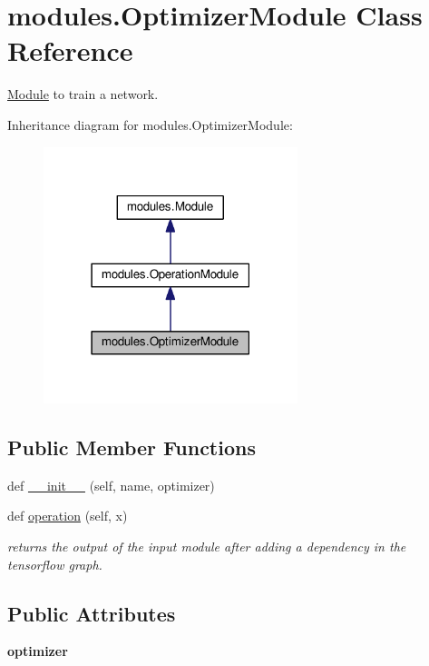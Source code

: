 \hypertarget{classmodules_1_1_optimizer_module}{}\section{modules.\+Optimizer\+Module Class Reference}
\label{classmodules_1_1_optimizer_module}


\hyperlink{classmodules_1_1_module}{Module} to train a network.  




Inheritance diagram for modules.\+Optimizer\+Module\+:\nopagebreak
\begin{figure}[H]
\begin{center}
\leavevmode
\includegraphics[width=210pt]{classmodules_1_1_optimizer_module__inherit__graph}
\end{center}
\end{figure}
\subsection*{Public Member Functions}
\begin{DoxyCompactItemize}
\item 
def \hyperlink{classmodules_1_1_optimizer_module_a82007e9145e1e80e6485c2de0f7ec5b6}{\+\_\+\+\_\+init\+\_\+\+\_\+} (self, name, optimizer)
\item 
def \hyperlink{classmodules_1_1_optimizer_module_ad8ab7a66f2eb4b2480bd1eea28a28f79}{operation} (self, x)
\begin{DoxyCompactList}\small\item\em returns the output of the input module after adding a dependency in the tensorflow graph. \end{DoxyCompactList}\end{DoxyCompactItemize}
\subsection*{Public Attributes}
\begin{DoxyCompactItemize}
\item 
\mbox{\label{classmodules_1_1_optimizer_module_a35feb31fdf5fb6ab303cffe97daa7683}} 
{\bfseries optimizer}
\end{DoxyCompactItemize}


